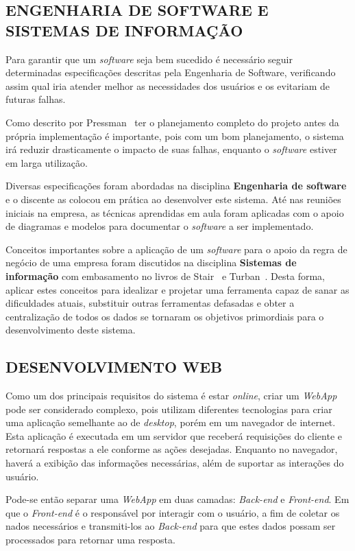 \documentclass[
  12pt,            %
  openany,
  oneside,
  a4paper,         %
  english,      %
  brazil
]{article}
\numberwithin{figure}{section}
\numberwithin{table}{section}
\begin{document}
\subsection{ENGENHARIA DE SOFTWARE E SISTEMAS DE INFORMAÇÃO}
Para garantir que um \textit{software} seja bem sucedido é necessário seguir determinadas especificações descritas pela Engenharia de Software, verificando assim qual iria atender melhor as necessidades dos usuários e os evitariam de futuras falhas.

Como descrito por Pressman~\cite{pressman} ter o planejamento completo do projeto antes da própria implementação é importante, pois com um bom planejamento, o sistema irá reduzir drasticamente o impacto de suas falhas, enquanto o \textit{software} estiver em larga utilização.

Diversas especificações foram abordadas na disciplina \textbf{Engenharia de software} e o discente as colocou em prática ao desenvolver este sistema. Até nas reuniões iniciais na empresa, as técnicas aprendidas em aula foram aplicadas com o apoio de diagramas e modelos para documentar o \textit{software} a ser implementado.

Conceitos importantes sobre a aplicação de um \textit{software} para o apoio da regra de negócio de uma empresa foram discutidos na disciplina \textbf{Sistemas de informação} com embasamento no livros de Stair~\cite{SI_principios} e Turban~\cite{SI_turban}. Desta forma, aplicar estes conceitos para idealizar e projetar uma ferramenta capaz de sanar as dificuldades atuais, substituir outras ferramentas defasadas e obter a centralização de todos os dados se tornaram os objetivos primordiais para o desenvolvimento deste sistema.

\subsection{DESENVOLVIMENTO WEB}
Como um dos principais requisitos do sistema é estar \textit{online}, criar um \textit{WebApp} pode ser considerado complexo, pois utilizam diferentes tecnologias para criar uma aplicação semelhante ao de \textit{desktop}, porém em um navegador de internet. Esta aplicação é executada em um servidor que receberá requisições do cliente e retornará respostas a ele conforme as ações desejadas. Enquanto no navegador, haverá a exibição das informações necessárias, além de suportar as interações do usuário.

Pode-se então separar uma \textit{WebApp} em duas camadas: \textit{Back-end} e \textit{Front-end}. Em que o \textit{Front-end} é o responsável por interagir com o usuário, a fim de coletar os nados necessários e transmiti-los ao \textit{Back-end} para que estes dados possam ser processados para retornar uma resposta.
\end{document}
